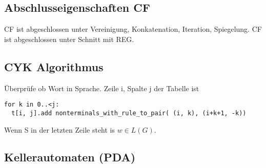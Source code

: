 \documentclass[9pt]{article}
\begin{document}
\subsection{Abschlusseigenschaften CF}
CF ist abgeschlossen unter Vereinigung, Konkatenation, Iteration, Spiegelung. CF ist abgeschlossen unter Schnitt mit REG.
\subsection{CYK Algorithmus}
Überprüfe ob Wort in Sprache. Zeile i, Spalte j der Tabelle ist
 \begin{lstlisting}
for k in 0..<j:
  t[i, j].add nonterminals_with_rule_to_pair( (i, k), (i+k+1, -k))
 \end{lstlisting}
 Wenn S in der letzten Zeile steht is $w \in L(G)$.
 \subsection{Kellerautomaten (PDA)}
\end{document}
